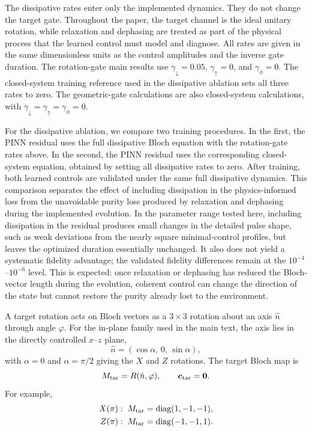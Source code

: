 \documentclass[aps,prx,reprint,superscriptaddress,nofootinbib,longbibliography,floatfix,showkeys]{revtex4-2}
\newcommand{\Mtar}{M_{\rm tar}}
\newcommand{\ctar}{\bm c_{\rm tar}}
\begin{document}
The dissipative rates enter only the implemented dynamics.  They do not
change the target gate.  Throughout the paper, the target channel is the
ideal unitary rotation, while relaxation and dephasing are treated as part
of the physical process that the learned control must model and diagnose.
All rates are given in the same dimensionless units as the control amplitudes
and the inverse gate duration.  The rotation-gate main results use
$\gamma_\downarrow=0.05$, $\gamma_\uparrow=0$, and $\gamma_\phi=0$.
The closed-system training reference used in the dissipative ablation sets all
three rates to zero.  The geometric-gate calculations are also closed-system
calculations, with $\gamma_\downarrow=\gamma_\uparrow=\gamma_\phi=0$.

For the dissipative ablation, we compare two training procedures.  In the
first, the PINN residual uses the full dissipative Bloch equation with the
rotation-gate rates above.  In the second, the PINN residual uses the
corresponding closed-system equation, obtained by setting all dissipative
rates to zero.  After training, both learned controls are validated under the
same full dissipative dynamics.  This comparison separates the effect of
including dissipation in the physics-informed loss from the unavoidable purity
loss produced by relaxation and dephasing during the implemented evolution.
In the parameter range tested here, including dissipation in the residual
produces small changes in the detailed pulse shape, such as weak deviations
from the nearly square minimal-control profiles, but leaves the optimized
duration essentially unchanged.  It also does not yield a systematic fidelity
advantage; the validated fidelity differences remain at the $10^{-4}$--$10^{-6}$
level.  This is expected:
once relaxation or dephasing has reduced the Bloch-vector length during the
evolution, coherent control can change the direction of the state but cannot
restore the purity already lost to the environment.

A target rotation acts on Bloch vectors as a $3\times3$ rotation about an
axis $\hat n$ through angle $\varphi$.  For the in-plane family used in the
main text, the axis lies in the directly controlled $x$--$z$ plane,
\begin{equation}
    \hat n=(\cos\alpha,\,0,\,\sin\alpha),
\end{equation}
with $\alpha=0$ and $\alpha=\pi/2$ giving the $X$ and $Z$ rotations.  The
target Bloch map is
\begin{equation}
    \Mtar=R(\hat n,\varphi),\qquad \ctar=\bm 0 .
\end{equation}
For example,
\begin{equation}
    \begin{aligned}
    X(\pi):\;\Mtar&=\operatorname{diag}(1,-1,-1),\\
    Z(\pi):\;\Mtar&=\operatorname{diag}(-1,-1,1).
    \end{aligned}
\end{equation}
\end{document}
